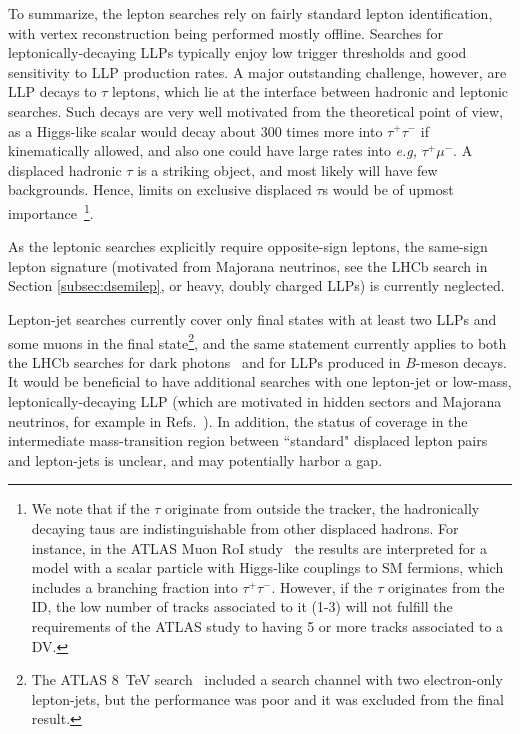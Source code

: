 To summarize, the lepton searches rely on fairly standard lepton identification, with vertex reconstruction being performed mostly offline. Searches for leptonically-decaying LLPs typically enjoy low trigger thresholds and good sensitivity to LLP production rates. A major outstanding challenge, however, are LLP decays to $\tau$ leptons, which lie at the interface between hadronic and leptonic searches. Such decays are very well motivated from the theoretical point of view, as a Higgs-like scalar would decay about 300 times more into $\tau^+ \tau^-$ if kinematically allowed, and also one could have large rates into \emph{e.g,} $\tau^+ \mu^-$.   A displaced hadronic $\tau$ is a striking object, and most likely will have few backgrounds. Hence, limits on exclusive displaced $\tau$s would be of upmost importance~\footnote{We note that if the $\tau$ originate from outside the tracker, the hadronically decaying taus are indistinguishable from other displaced hadrons. For instance, in the ATLAS Muon RoI study~\cite{Aad:2015uaa} the results are interpreted for a model with a scalar particle with Higgs-like couplings to SM fermions, which includes a branching fraction into $\tau^+ \tau^-$. However, if the $\tau$ originates from the ID, the low number of tracks associated to it (1-3) will not fulfill the requirements of the ATLAS study to having 5 or more tracks associated to a DV.}.

As the leptonic searches explicitly require opposite-sign leptons, the same-sign lepton signature (motivated from Majorana neutrinos, see the LHCb search in Section \ref{subsec:dsemilep}, or heavy, doubly charged LLPs) is currently neglected.

Lepton-jet searches currently cover only final states with at least two LLPs and some muons in the final state\footnote{The ATLAS 8~TeV search~\cite{Aad:2014yea} included a search channel with two electron-only lepton-jets, but the performance was poor and it was excluded from the final result.}, and the same statement currently applies to both the LHCb searches for dark photons~\cite{Aaij:2016rxn,Aaij:2017rft} 
 and for LLPs produced in $B$-meson decays. It would be beneficial to have additional searches with one lepton-jet or low-mass, leptonically-decaying LLP (which are motivated in hidden sectors and Majorana neutrinos, for example in Refs.~\cite{Izaguirre:2015pga,Izaguirre:2015zva}). In addition, the status of coverage in the intermediate mass-transition region between ``standard" displaced lepton pairs and lepton-jets is unclear, and may potentially harbor a gap.  

